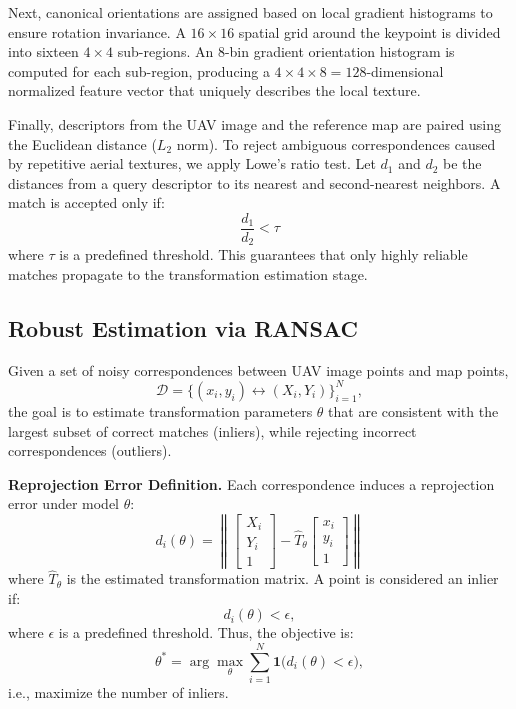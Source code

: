 Next, canonical orientations are assigned based on local gradient histograms to ensure rotation invariance. A $16 \times 16$ spatial grid around the keypoint is divided into sixteen $4 \times 4$ sub-regions. An 8-bin gradient orientation histogram is computed for each sub-region, producing a $4 \times 4 \times 8 = 128$-dimensional normalized feature vector that uniquely describes the local texture.

Finally, descriptors from the UAV image and the reference map are paired using the Euclidean distance ($L_2$ norm). To reject ambiguous correspondences caused by repetitive aerial textures, we apply Lowe's ratio test. Let $d_1$ and $d_2$ be the distances from a query descriptor to its nearest and second-nearest neighbors. A match is accepted only if:
\begin{equation}
\frac{d_1}{d_2} < \tau
\end{equation}
where $\tau$ is a predefined threshold. This guarantees that only highly reliable matches propagate to the transformation estimation stage.

\subsection{Robust Estimation via RANSAC}\label{subsec:ransac}
Given a set of noisy correspondences between UAV image points and map points,
\[
\mathcal{D} = \{(x_i, y_i) \leftrightarrow (X_i, Y_i)\}_{i=1}^{N},
\]
the goal is to estimate transformation parameters $\theta$
that are consistent with the largest subset of correct matches (inliers),
while rejecting incorrect correspondences (outliers).

\textbf{Reprojection Error Definition.}
Each correspondence induces a reprojection error under model $\theta$:
\[
d_i(\theta) = \left\|
\begin{bmatrix} X_i \\ Y_i \\ 1 \end{bmatrix}
-
\hat{T}_\theta
\begin{bmatrix} x_i \\ y_i \\ 1 \end{bmatrix}
\right\|
\]
where $\hat{T}_\theta$ is the estimated transformation matrix.
A point is considered an inlier if:
\[
d_i(\theta) < \epsilon,
\]
where $\epsilon$ is a predefined threshold.
Thus, the objective is:
\[
\theta^* = \arg\max_{\theta} \sum_{i=1}^{N} \mathbf{1}\big(d_i(\theta) < \epsilon\big),
\]
i.e., maximize the number of inliers.

